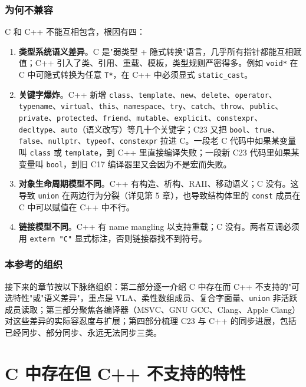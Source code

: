 \documentclass[12pt,a4paper,fontset=fandol]{ctexbook}
\newcommand{\cpp}[1]{C++#1}
\newcommand{\kw}[1]{\texttt{#1}}
\begin{document}
\section{为何不兼容}

C 和 \cpp{} 不能互相包含，根因有四：

\begin{enumerate}
  \item \textbf{类型系统语义差异}。C 是"弱类型 + 隐式转换"语言，几乎所有指针都能互相赋值；\cpp{} 引入了类、引用、重载、模板，类型规则严密得多。例如 \kw{void*} 在 C 中可隐式转换为任意 \kw{T*}，在 \cpp{} 中必须显式 \kw{static\_cast}。
  \item \textbf{关键字爆炸}。\cpp{} 新增 \kw{class}、\kw{template}、\kw{new}、\kw{delete}、\kw{operator}、\kw{typename}、\kw{virtual}、\kw{this}、\kw{namespace}、\kw{try}、\kw{catch}、\kw{throw}、\kw{public}、\kw{private}、\kw{protected}、\kw{friend}、\kw{mutable}、\kw{explicit}、\kw{constexpr}、\kw{decltype}、\kw{auto}（语义改写）等几十个关键字；C23 又把 \kw{bool}、\kw{true}、\kw{false}、\kw{nullptr}、\kw{typeof}、\kw{constexpr} 拉进 C。一段老 C 代码中如果某变量叫 \kw{class} 或 \kw{template}，到 \cpp{} 里直接编译失败；一段新 C23 代码里如果某变量叫 \kw{bool}，到旧 C17 编译器里又会因为不是宏而失败。
  \item \textbf{对象生命周期模型不同}。\cpp{} 有构造、析构、RAII、移动语义；C 没有。这导致 \kw{union} 在两边行为分裂（详见第 5 章），也导致结构体里的 \kw{const} 成员在 C 中可以赋值在 \cpp{} 中不行。
  \item \textbf{链接模型不同}。\cpp{} 有 name mangling 以支持重载；C 没有。两者互调必须用 \kw{extern "C"} 显式标注，否则链接器找不到符号。
\end{enumerate}

\section{本参考的组织}

接下来的章节按以下脉络组织：第二部分逐一介绍 C 中存在而 \cpp{} 不支持的"可选特性"或"语义差异"，重点是 VLA、柔性数组成员、复合字面量、\kw{union} 非活跃成员读取；第三部分聚焦各编译器（MSVC、GNU GCC、Clang、Apple Clang）对这些差异的实际容忍度与扩展；第四部分梳理 C23 与 \cpp{} 的同步进展，包括已经同步、部分同步、永远无法同步三类。

\part{C 中存在但 C++ 不支持的特性}
\end{document}
